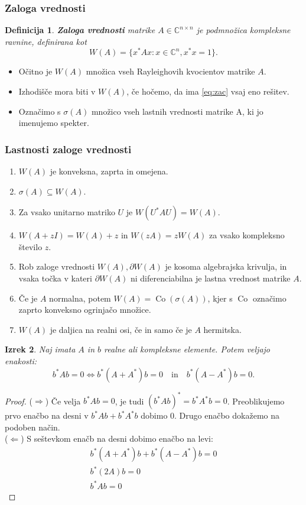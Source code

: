 \documentclass{beamer}
\newcommand{\Co}{\operatorname{Co}} %
\newcommand{\C}{\mathbb C}
\newtheorem{izrek}{Izrek}
\newtheorem{definicija}[izrek]{Definicija}
\begin{document}
\begin{frame}
\frametitle{Zaloga vrednosti}
\begin{definicija}
\textbf{Zaloga vrednosti} matrike $A \in \C^{n\times n}$ je podmnožica kompleksne ravnine, definirana kot
$$W(A)=\{x^\ast Ax: x \in \C^n, x^\ast x=1\}.$$
\end{definicija}\pause
\begin{itemize}
\item Očitno je $W(A)$ množica vseh Rayleighovih kvocientov matrike $A$.
\item Izhodišče mora biti v $W(A)$, če hočemo, da ima \eqref{eq:zac} vsaj eno rešitev.
\item Označimo s $\sigma(A)$ množico vseh lastnih vrednosti matrike A, ki jo imenujemo spekter.
\end{itemize}
\end{frame}
\begin{frame}
\frametitle{Lastnosti zaloge vrednosti}
\begin{enumerate}
\item $W(A)$ je konveksna, zaprta in omejena.
\item $\sigma(A)\subseteq W(A).$
\item Za vsako unitarno matriko $U$ je $W(U^\ast AU)=W(A).$
\item $W(A+zI)=W(A)+z$ in $W(zA)=zW(A)$ za vsako kompleksno število $z$.
\item Rob zaloge vrednosti $W(A), \partial W(A)$ je kosoma algebrajska krivulja, in vsaka točka v kateri $\partial W(A)$ ni diferenciabilna je lastna vrednost matrike $A$.
\item Če je $A$ normalna, potem $W(A)=\Co(\sigma(A))$, kjer s $\Co$ označimo zaprto konveksno ogrinjačo množice.
\item $W(A)$ je daljica na realni osi, če in samo če je $A$ hermitska.
\end{enumerate}
\end{frame}
\begin{frame}
\begin{izrek}
Naj imata $A$ in $b$ realne ali kompleksne elemente. Potem veljajo enakosti:
$$b^\ast Ab=0\Leftrightarrow b^\ast (A+A^\ast)b=0 \quad \text{in}\quad  b^\ast(A-A^\ast)b=0.$$
\end{izrek}\pause
\begin{proof}
($\Rightarrow$) Če velja $b^\ast Ab=0$, je tudi $(b^\ast Ab)^\ast=b^\ast A^\ast b=0$. Preoblikujemo prvo enačbo na desni v $b^\ast Ab +b^\ast A^\ast b$ dobimo 0. Drugo enačbo dokažemo na podoben način.\\
($\Leftarrow$) S seštevkom enačb na desni dobimo enačbo na levi:
\begin{align*}
 b^\ast (A+A^\ast)b+b^\ast(A-A^\ast)b=0\\
b^\ast (2A)b=0\\
b^\ast Ab=0
\end{align*}
\end{proof}
\end{frame}
\end{document}
